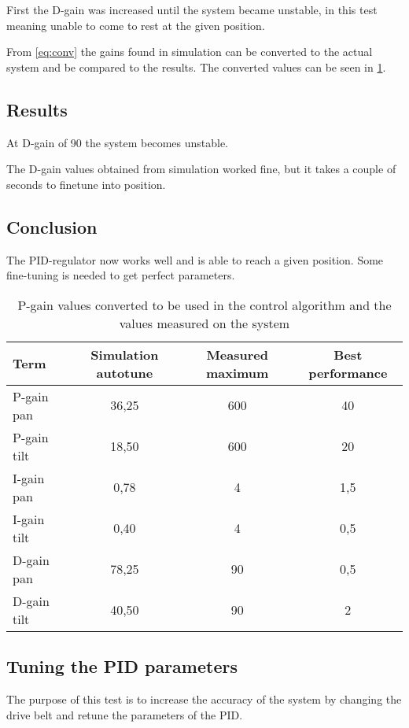 First the D-gain was increased until the system became unstable, in this test
meaning unable to come to rest at the given position.

From \ref{eq:conv} the gains found in simulation can be converted to the actual
system and be compared to the results. The converted values can be seen in
\ref{tab:actual_gain_values}. 

\subsection*{Results}
At D-gain of 90 the system becomes unstable.

The D-gain values obtained from simulation worked fine, but it takes a couple of
seconds to finetune into position.

\subsection*{Conclusion}
The PID-regulator now works well and is able to reach a given position. Some
fine-tuning is needed to get perfect parameters.

\begin{table}[htb]
	\begin{center}
	\begin{tabular}{l|c|c|c}			
	Term & Simulation autotune & Measured maximum & Best performance  \\	\hline								
	P-gain pan & 36,25 & 600 & 40 \\
	P-gain tilt   & 18,50 & 600 & 20 \\
	I-gain pan  & 0,78 & 4 & 1,5 \\
	I-gain tilt   & 0,40  & 4 & 0,5 \\
	D-gain pan & 78,25 & 90 & 0,5 \\
	D-gain tilt   & 40,50 & 90 & 2 \\
	\end{tabular}
	\end{center}
	\caption{P-gain values converted to be used in the control algorithm and the values measured on the system}				
	\label{tab:actual_gain_values}			
\end{table}

\subsection{Tuning the PID parameters}
The purpose of this test is to increase the accuracy of the system by changing
the drive belt and retune the parameters of the PID.

